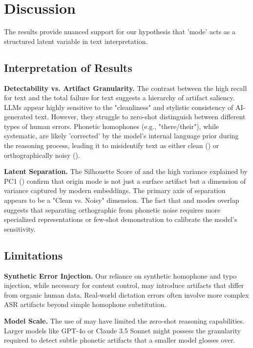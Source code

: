 \section{Discussion}
\label{sec:discussion}

The results provide nuanced support for our hypothesis that 'mode' acts as a structured latent variable in text interpretation.

\subsection{Interpretation of Results}

{\bf Detectability vs. Artifact Granularity.}
The contrast between the high recall for \aigen text and the total failure for \dictated text suggests a hierarchy of artifact saliency.
LLMs appear highly sensitive to the "cleanliness" and stylistic consistency of AI-generated text.
However, they struggle to zero-shot distinguish between different types of human errors.
Phonetic homophones (e.g., "there/their"), while systematic, are likely 'corrected' by the model's internal language prior during the reasoning process, leading it to misidentify \dictated text as either clean (\aigen) or orthographically noisy (\typed).

{\bf Latent Separation.}
The Silhouette Score of \silhouette and the high variance explained by PC1 (\pcaone) confirm that origin mode is not just a surface artifact but a dimension of variance captured by modern embeddings.
The primary axis of separation appears to be a "Clean vs. Noisy" dimension.
The fact that \dictated and \typed modes overlap suggests that separating orthographic from phonetic noise requires more specialized representations or few-shot demonstration to calibrate the model's sensitivity.

\subsection{Limitations}

{\bf Synthetic Error Injection.}
Our reliance on synthetic homophone and typo injection, while necessary for content control, may introduce artifacts that differ from organic human data.
Real-world dictation errors often involve more complex ASR artifacts beyond simple homophone substitution.

{\bf Model Scale.}
The use of \gptmini may have limited the zero-shot reasoning capabilities.
Larger models like GPT-4o or Claude 3.5 Sonnet might possess the granularity required to detect subtle phonetic artifacts that a smaller model glosses over.


